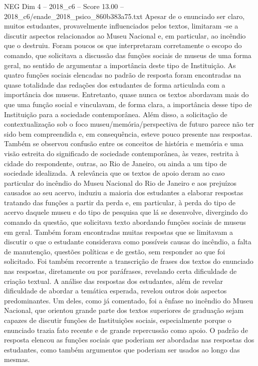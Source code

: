 \begin{textsample}{NEG Dim 4 – 2018\_c6 – Score 13.00 – 2018\_c6/enade\_2018\_psico\_860b383a75.txt}
Apesar de o enunciado ser claro, muitos estudantes, provavelmente influenciados pelos textos, limitaram -se a discutir aspectos relacionados ao Museu Nacional e, em particular, ao incêndio que o destruiu.
Foram poucos os que interpretaram corretamente o escopo do comando, que solicitava a discussão das funções sociais de museus de uma forma geral, no sentido de argumentar a importância deste tipo de Instituição.
As quatro funções sociais elencadas no padrão de resposta foram encontradas na quase totalidade das redações dos estudantes de forma articulada com a importância dos museus.
Entretanto, quase nunca os textos abordavam mais do que uma função social e vinculavam, de forma clara, a importância desse tipo de Instituição para a sociedade contemporânea.
Além disso, a solicitação de contextualização sob o foco museu/memória/perspectiva de futuro parece não ter sido bem compreendida e, em consequência, esteve pouco presente nas respostas.
Também se observou confusão entre os conceitos de história e memória e uma visão estreita do significado de sociedade contemporânea, às vezes, restrita à cidade do respondente, outras, ao Rio de Janeiro, ou ainda a um tipo de sociedade idealizada.
A relevância que os textos de apoio deram ao caso particular do incêndio do Museu Nacional do Rio de Janeiro e aos prejuízos causados ao seu acervo, induziu a maioria dos estudantes a elaborar respostas tratando das funções a partir da perda e, em particular, à perda do tipo de acervo daquele museu e do tipo de pesquisa que lá se desenvolve, divergindo do comando da questão, que solicitava texto abordando funções sociais de museus em geral.
Também foram encontradas muitas respostas que se limitavam a discutir o que o estudante considerava como possíveis causas do incêndio, a falta de manutenção, questões políticas e de gestão, sem responder ao que foi solicitado.
Foi também recorrente a transcrição de frases dos textos do enunciado nas respostas, diretamente ou por paráfrases, revelando certa dificuldade de criação textual.
A análise das respostas dos estudantes, além de revelar dificuldade de abordar a temática esperada, revelou outros dois aspectos predominantes.
Um deles, como já comentado, foi a ênfase no incêndio do Museu Nacional, que orientou grande parte dos textos superiores de graduação sejam capazes de discutir funções de Instituições sociais, especialmente porque o enunciado trazia fato recente e de grande repercussão como apoio.
O padrão de resposta elencou as funções sociais que poderiam ser abordadas nas respostas dos estudantes, como também argumentos que poderiam ser usados ao longo das mesmas.

\end{textsample}
